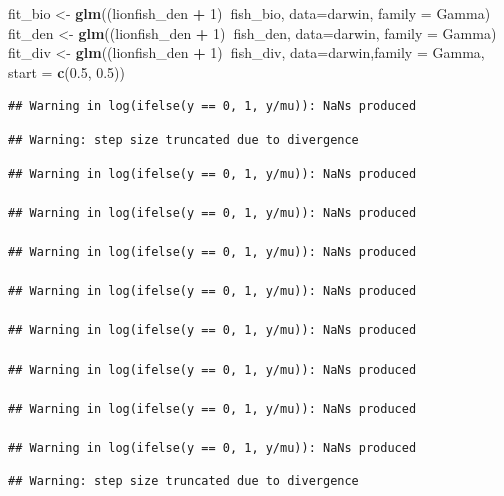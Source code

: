 \documentclass[]{article}
\newenvironment{Shaded}{\begin{snugshade}}{\end{snugshade}}
\newcommand{\KeywordTok}[1]{\textcolor[rgb]{0.13,0.29,0.53}{\textbf{#1}}}
\newcommand{\DataTypeTok}[1]{\textcolor[rgb]{0.13,0.29,0.53}{#1}}
\newcommand{\DecValTok}[1]{\textcolor[rgb]{0.00,0.00,0.81}{#1}}
\newcommand{\FloatTok}[1]{\textcolor[rgb]{0.00,0.00,0.81}{#1}}
\newcommand{\StringTok}[1]{\textcolor[rgb]{0.31,0.60,0.02}{#1}}
\newcommand{\OperatorTok}[1]{\textcolor[rgb]{0.81,0.36,0.00}{\textbf{#1}}}
\newcommand{\NormalTok}[1]{#1}
\begin{document}
\begin{Shaded}
\begin{Highlighting}[]
\NormalTok{fit_bio <-}\StringTok{ }\KeywordTok{glm}\NormalTok{((lionfish_den }\OperatorTok{+}\StringTok{ }\DecValTok{1}\NormalTok{)}\OperatorTok{~}\NormalTok{fish_bio, }\DataTypeTok{data=}\NormalTok{darwin, }\DataTypeTok{family =}\NormalTok{ Gamma)}
\NormalTok{fit_den <-}\StringTok{ }\KeywordTok{glm}\NormalTok{((lionfish_den }\OperatorTok{+}\StringTok{ }\DecValTok{1}\NormalTok{)}\OperatorTok{~}\NormalTok{fish_den, }\DataTypeTok{data=}\NormalTok{darwin, }\DataTypeTok{family =}\NormalTok{ Gamma)}
\NormalTok{fit_div <-}\StringTok{ }\KeywordTok{glm}\NormalTok{((lionfish_den }\OperatorTok{+}\StringTok{ }\DecValTok{1}\NormalTok{)}\OperatorTok{~}\NormalTok{fish_div, }\DataTypeTok{data=}\NormalTok{darwin,}\DataTypeTok{family =}\NormalTok{ Gamma, }\DataTypeTok{start =} \KeywordTok{c}\NormalTok{(}\FloatTok{0.5}\NormalTok{, }\FloatTok{0.5}\NormalTok{))}
\end{Highlighting}
\end{Shaded}

\begin{verbatim}
## Warning in log(ifelse(y == 0, 1, y/mu)): NaNs produced
\end{verbatim}

\begin{verbatim}
## Warning: step size truncated due to divergence
\end{verbatim}

\begin{verbatim}
## Warning in log(ifelse(y == 0, 1, y/mu)): NaNs produced

## Warning in log(ifelse(y == 0, 1, y/mu)): NaNs produced

## Warning in log(ifelse(y == 0, 1, y/mu)): NaNs produced

## Warning in log(ifelse(y == 0, 1, y/mu)): NaNs produced

## Warning in log(ifelse(y == 0, 1, y/mu)): NaNs produced

## Warning in log(ifelse(y == 0, 1, y/mu)): NaNs produced

## Warning in log(ifelse(y == 0, 1, y/mu)): NaNs produced

## Warning in log(ifelse(y == 0, 1, y/mu)): NaNs produced
\end{verbatim}

\begin{verbatim}
## Warning: step size truncated due to divergence
\end{verbatim}
\end{document}
